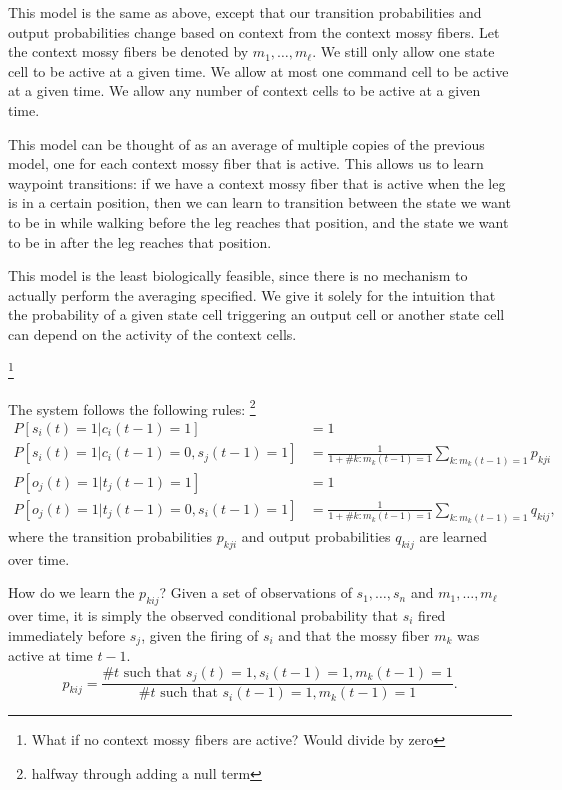\documentclass{article}
\theoremstyle{definition}
\begin{document}
This model is the same as above, except that our transition
probabilities and output probabilities change based on context from
the context mossy fibers. Let the context mossy fibers be denoted by
$m_1, \dots, m_\ell$. We still only allow one state cell to be active
at a given time. We allow at most one command cell to be active at a
given time. We allow any number of context cells to be active at a
given time.

This model can be thought of as an average of multiple copies of the
previous model, one for each context mossy fiber that is active. This
allows us to learn waypoint transitions: if we have a context mossy
fiber that is active when the leg is in a certain position, then we
can learn to transition between the state we want to be in while
walking before the leg reaches that position, and the state we want to
be in after the leg reaches that position.

This model is the least biologically feasible, since there is no
mechanism to actually perform the averaging specified. We give it
solely for the intuition that the probability of a given state cell
triggering an output cell or another state cell can depend on the
activity of the context cells.

\footnote{What if no context mossy fibers are active? Would divide by zero}

The system follows the following rules:
\footnote{halfway through adding a null term}
\begin{align*}
P \left[ s_i(t)=1 | c_i(t-1)=1 \right] &= 1 \\
P \left[ s_i(t)=1 | c_i(t-1)=0, s_j(t-1)=1 \right] &= \frac{1}{1 + \# k : m_k(t-1)=1} \sum_{k : m_k(t-1)=1} p_{kji}  \\
P \left[ o_j(t)=1 | t_j(t-1)=1 \right] &= 1 \\
P \left[ o_j(t)=1 | t_j(t-1)=0, s_i(t-1)=1 \right] &= \frac{1}{1 + \# k : m_k(t-1)=1}
\sum_{k : m_k(t-1)=1} q_{kij},
\end{align*}
where the transition probabilities $p_{kji}$ and output probabilities $q_{kij}$ are learned over time.

How do we learn the $p_{kij}$? Given a set of observations of $s_1,
\dots, s_n$ and $m_1, \dots, m_\ell$ over time, it is simply the
observed conditional probability that $s_i$ fired immediately before
$s_j$, given the firing of $s_i$ and that the mossy fiber $m_k$ was
active at time $t-1$.
$$p_{kij} = \frac{\mbox{\# $t$ such that $s_j(t)=1, s_i(t-1)=1, m_k(t-1)=1$}}
{\mbox{\# $t$ such that $s_i(t-1)=1, m_k(t-1)=1$}}.$$
\end{document}
